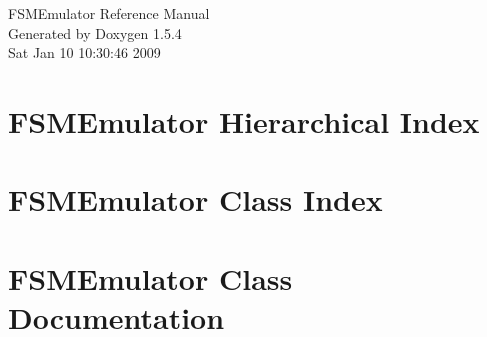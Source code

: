\documentclass[a4paper]{book}
\begin{document}
\begin{titlepage}
\vspace*{7cm}
\begin{center}
{\Large FSMEmulator Reference Manual}\\
\vspace*{1cm}
{\large Generated by Doxygen 1.5.4}\\
\vspace*{0.5cm}
{\small Sat Jan 10 10:30:46 2009}\\
\end{center}
\end{titlepage}
\clearemptydoublepage
{}
\tableofcontents
\clearemptydoublepage
{}
\chapter{FSMEmulator Hierarchical Index}

\chapter{FSMEmulator Class Index}

\chapter{FSMEmulator Class Documentation}








\printindex
\end{document}
